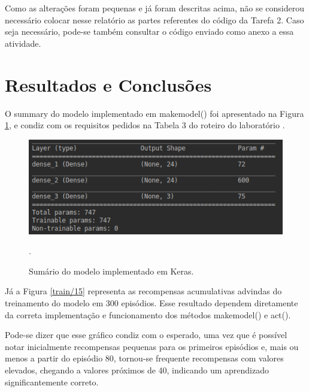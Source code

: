 \documentclass[conference]{IEEEtran}
\begin{document}
Como as alterações foram pequenas e já foram descritas acima, não se considerou necessário colocar nesse relatório as partes referentes do código da Tarefa 2. Caso seja necessário, pode-se também consultar o código enviado como anexo a essa atividade. 

\section{Resultados e Conclusões} \label{results}

	O summary do modelo implementado em make\underline{\space}model() foi apresentado na Figura \ref{summary}, e condiz com os requisitos pedidos na Tabela 3 do roteiro do laboratório \cite{roteiro}. 

\begin{figure}[htbp]
\centering
\centerline{\includegraphics[scale=0.5]{imagens/summary.png}}
\caption{Sumário do modelo implementado em Keras.}.
\label{summary}
\end{figure}

	Já a Figura \ref{train/15} representa as recompensas acumulativas advindas do treinamento do modelo em 300 episódios. Esse resultado dependem diretamente da correta implementação e funcionamento dos métodos make\underline{\space}model() e act().
	
	Pode-se dizer que esse gráfico condiz com o esperado, uma vez que é possível notar inicialmente recompensas pequenas para os primeiros episódios e, mais ou menos a partir do episódio 80, tornou-se frequente recompensas com valores elevados, chegando a valores próximos de 40, indicando um aprendizado significantemente correto.
\end{document}
